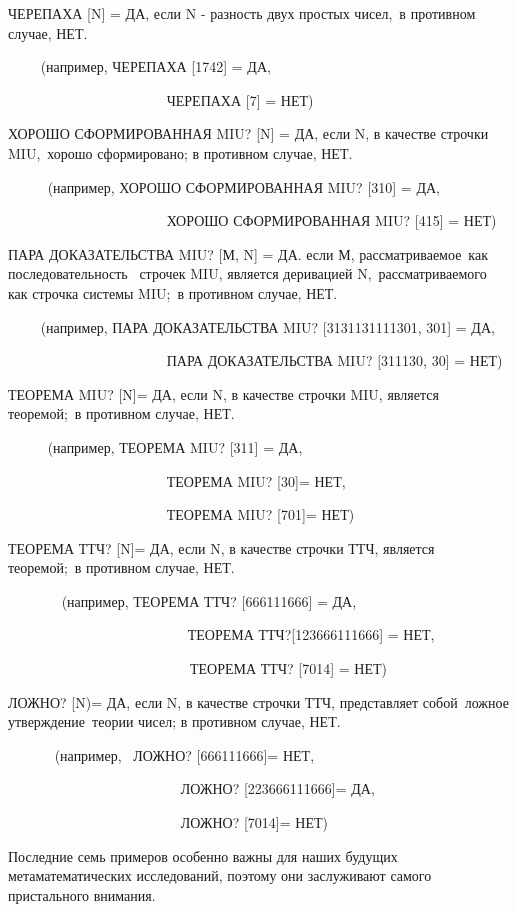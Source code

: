 \documentclass[../main.tex]{subfiles}
\begin{document}
ЧЕРЕПАХА {[}N{]} = ДА, если N - разность двух простых чисел,~в противном случае, НЕТ.

~~~~ (например, ЧЕРЕПАХА {[}1742{]} = ДА,

~~~~~~~~~~~~~~~~~~~~~~ ЧЕРЕПАХА {[}7{]} = НЕТ)

ХОРОШО СФОРМИРОВАННАЯ MIU? {[}N{]} = ДА, если N, в качестве строчки MIU,~хорошо сформировано; в противном случае, НЕТ.

~~~~~ (например, ХОРОШО СФОРМИРОВАННАЯ MIU? {[}310{]} = ДА,

~~~~~~~~~~~~~~~~~~~~~~ ХОРОШО СФОРМИРОВАННАЯ MIU? {[}415{]} = НЕТ)

ПАРА ДОКАЗАТЕЛЬСТВА MIU? {[}М, N{]} = ДА. если М, рассматриваемое~как~ последовательность~ строчек MIU, является деривацией N,~рассматриваемого~ как строчка системы MIU;~в противном случае, НЕТ.

~~~~ (например, ПАРА ДОКАЗАТЕЛЬСТВА MIU? {[}3131131111301, 301{]} = ДА,

~~~~~~~~~~~~~~~~~~~~~~ ПАРА ДОКАЗАТЕЛЬСТВА MIU? {[}311130, 30{]} = НЕТ)

ТЕОРЕМА MIU? {[}N{]}= ДА, если N, в качестве строчки MIU, является теоремой;~в противном случае, НЕТ.

~~~~~ (например, ТЕОРЕМА MIU? {[}311{]} = ДА,

~~~~~~~~~~~~~~~~~~~~~~ ТЕОРЕМА MIU? {[}30{]}= НЕТ,

~~~~~~~~~~~~~~~~~~~~~ ~ТЕОРЕМА MIU? {[}701{]}= НЕТ)

ТЕОРЕМА ТТЧ? {[}N{]}= ДА, если N, в качестве строчки ТТЧ, является теоремой;~в противном случае, НЕТ.

~~~~~~~ (например, ТЕОРЕМА ТТЧ? {[}666111666{]} = ДА,

~~~~~~~~~~~~~~~~~~~~~~~~~ ТЕОРЕМА ТТЧ?{[}123666111666{]} = НЕТ,

~~~~~~~~~~~~~~~~~~~~~~~~~~ТЕОРЕМА ТТЧ? {[}7014{]} = НЕТ)

ЛОЖНО? {[}N)= ДА, если N, в качестве строчки ТТЧ, представляет собой~ложное утверждение~теории чисел; в противном случае, НЕТ.

~~~~~~ (например,~ ЛОЖНО? {[}666111666{]}= НЕТ,

~~~~~~~~~~~~~~~~~~~~~~~~ ЛОЖНО? {[}223666111666{]}= ДА,

~~~~~~~~~~~~~~~~~~~~~~~ ~ЛОЖНО? {[}7014{]}= НЕТ)

Последние семь примеров особенно важны для наших будущих метаматематических исследований, поэтому они заслуживают самого пристального внимания.
\end{document}
